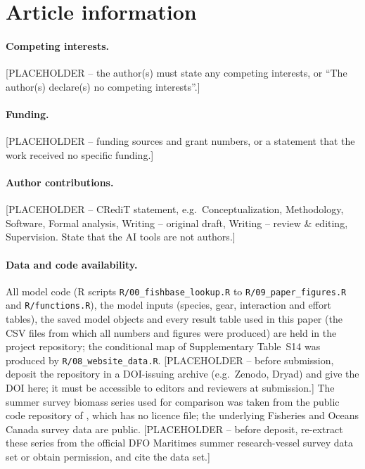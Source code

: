 \documentclass[12pt,letterpaper,fleqn]{article}
\begin{document}
\section*{Article information}

\paragraph{Competing interests.} [PLACEHOLDER -- the author(s) must state any competing interests, or ``The author(s) declare(s) no competing interests''.]

\paragraph{Funding.} [PLACEHOLDER -- funding sources and grant numbers, or a statement that the work received no specific funding.]

\paragraph{Author contributions.} [PLACEHOLDER -- CRediT statement, e.g.\ Conceptualization, Methodology, Software, Formal analysis, Writing -- original draft, Writing -- review \& editing, Supervision. State that the AI tools are not authors.]

\paragraph{Data and code availability.} All model code (R scripts \texttt{R/00\_fishbase\_lookup.R} to \texttt{R/09\_paper\_figures.R} and \texttt{R/functions.R}), the model inputs (species, gear, interaction and effort tables), the saved model objects and every result table used in this paper (the CSV files from which all numbers and figures were produced) are held in the project repository; the conditional map of Supplementary Table~S14 was produced by \texttt{R/08\_website\_data.R}. [PLACEHOLDER -- before submission, deposit the repository in a DOI-issuing archive (e.g.\ Zenodo, Dryad) and give the DOI here; it must be accessible to editors and reviewers at submission.] The summer survey biomass series used for comparison was taken from the public code repository of \textcite{adekoya2026code}, which has no licence file; the underlying Fisheries and Oceans Canada survey data are public. [PLACEHOLDER -- before deposit, re-extract these series from the official DFO Maritimes summer research-vessel survey data set or obtain permission, and cite the data set.]
\end{document}
